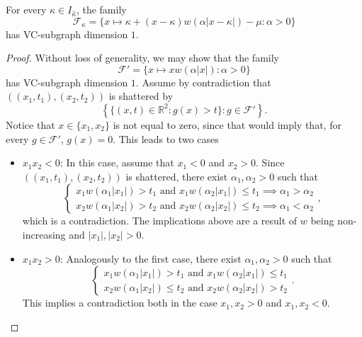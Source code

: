 \documentclass[10pt,a4paper]{amsart}
\def\R{\mathbb{R}} %
\def\sF{\mathcal{F}}
\begin{document}
\begin{lemma}
    \label{lemma:bound_vc_dim} For every $\kappa \in I_{\widehat{\kappa}}$, the family
    \[ \sF_\kappa = \{ x \mapsto \kappa + (x-\kappa)w(\alpha \lvert  x-\kappa\rvert ) - \mu : \alpha>0   \} \]
    has VC-subgraph dimension $1$.
\end{lemma}

\begin{proof}
  Without loss of generality, we may show that the family \[\sF'= \{ x \mapsto  xw(\alpha \lvert  x\rvert ) : \alpha>0  \}\] has VC-subgraph dimension $1$. Assume by contradiction that $((x_1,t_1),(x_2,t_2))$ is shattered by
\[
\left\{\{(x,t)\in \R^2: g(x)>t\}:g\in\sF'\right\}.
\]
Notice that $x\in\{x_1,x_2\}$ is not equal to zero, since that would imply that, for every $g\in\sF'$, $g(x)=0$. This leads to two cases 
\begin{itemize}
    \item $x_1x_2<0$:
    In this case, assume that $x_1<0$ and $x_2>0$. Since $((x_1,t_1),(x_2,t_2))$ is shattered, there exist $\alpha_1,\alpha_2>0$ such that
    \[
    \begin{cases}
        x_1w(\alpha_1 \lvert x_1 \rvert )>t_1\text{ and } x_1w(\alpha_2\lvert x_1 \rvert  )\leq t_1 \implies \alpha_1>\alpha_2\\
        x_2w(\alpha_1 \lvert x_2 \rvert )>t_2\text{ and } x_2w(\alpha_2 \lvert x_2 \rvert )\leq t_2 \implies \alpha_1<\alpha_2
    \end{cases},
    \]
    which is a contradiction. The implications above are a result of $w$ being non-increasing and $\lvert  x_1\rvert ,\lvert  x_2\rvert >0$.
    \item $x_1x_2>0$: Analogously to the first case, there exist $\alpha_1,\alpha_2>0$ such that
    \[
        \begin{cases}
        x_1w(\alpha_1 \lvert x_1 \rvert )>t_1\text{ and } x_1w(\alpha_2 \lvert x_1 \rvert )\leq t_1\\
        x_2w(\alpha_1 \lvert x_2 \rvert )\leq t_2\text{ and } x_2w(\alpha_2 \lvert x_2 \rvert )> t_2 
    \end{cases}.
    \]
    This implies a contradiction both in the case $x_1,x_2>0$ and $x_1,x_2<0$.\qedhere
\end{itemize}
\end{proof}
\end{document}
